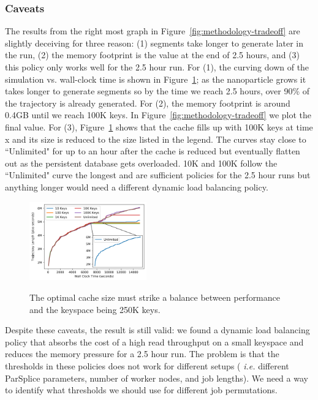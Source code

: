 \subsubsection*{Caveats}

The results from the right most graph in Figure~\ref{fig:methodology-tradeoff}
are slightly deceiving for three reason: (1) segments take longer to generate
later in the run, (2) the memory footprint is the value at the end of 2.5
hours, and (3) this policy only works well for the 2.5 hour run.  For (1), the
curving down of the simulation vs. wall-clock time is shown in
Figure~\ref{fig:methodology-trajectory}; as the nanoparticle grows it takes
longer to generate segments so by the time we reach 2.5 hours, over 90\% of the
trajectory is already generated.  For (2), the memory footprint is around 0.4GB
until we reach 100K keys. In Figure~\ref{fig:methodology-tradeoff} we plot the
final value. For (3), Figure~\ref{fig:methodology-trajectory} shows that the
cache fills up with 100K keys at time x and its size is reduced to the size
listed in the legend.  The curves stay close to ``Unlimited" for up to an hour
after the cache is reduced but eventually flatten out as the persistent
database gets overloaded. 10K and 100K follow the ``Unlimited" curve the
longest and are sufficient policies for the 2.5 hour runs but anything longer
would need a different dynamic load balancing policy.

\begin{figure}[tbh]
  \noindent\includegraphics[width=0.45\textwidth]{figures/methodology-trajectory.png}\\
  \caption{The optimal cache size must strike a balance between performance and
  the keyspace being 250K keys. \label{fig:methodology-trajectory}}
\end{figure}

Despite these caveats, the result is still valid: we found a dynamic load
balancing policy that absorbs the cost of a high read throughput on a small
keyspace and reduces the memory pressure for a 2.5 hour run. The problem is
that the thresholds in these policies does not work for different setups ({\it
i.e.} different ParSplice parameters, number of worker nodes, and job lengths).
We need a way to identify what thresholds we should use for different job
permutations.

